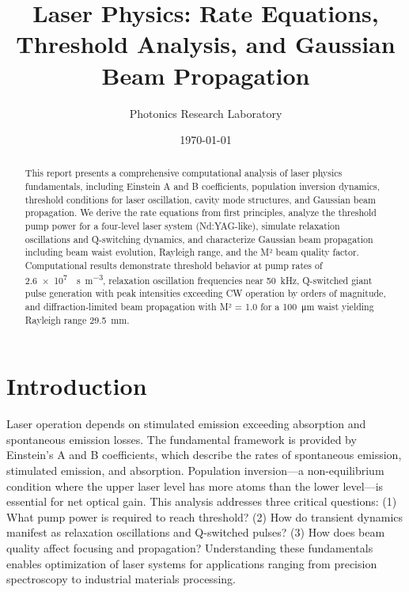 \documentclass[a4paper, 11pt]{article}
\title{Laser Physics: Rate Equations, Threshold Analysis, and Gaussian Beam Propagation}
\author{Photonics Research Laboratory}
\date{\today}
\begin{document}
\maketitle

\begin{abstract}
This report presents a comprehensive computational analysis of laser physics fundamentals,
including Einstein A and B coefficients, population inversion dynamics, threshold conditions
for laser oscillation, cavity mode structures, and Gaussian beam propagation. We derive the
rate equations from first principles, analyze the threshold pump power for a four-level
laser system (Nd:YAG-like), simulate relaxation oscillations and Q-switching dynamics, and
characterize Gaussian beam propagation including beam waist evolution, Rayleigh range, and
the M² beam quality factor. Computational results demonstrate threshold behavior at pump
rates of \SI{2.6e7}{\per\second\per\cubic\meter}, relaxation oscillation frequencies near
\SI{50}{\kilo\hertz}, Q-switched giant pulse generation with peak intensities exceeding
CW operation by orders of magnitude, and diffraction-limited beam propagation with M² = 1.0
for a \SI{100}{\micro\meter} waist yielding Rayleigh range \SI{29.5}{\milli\meter}.
\end{abstract}

\section{Introduction}

Laser operation depends on stimulated emission exceeding absorption and spontaneous emission
losses. The fundamental framework is provided by Einstein's A and B coefficients, which
describe the rates of spontaneous emission, stimulated emission, and absorption. Population
inversion—a non-equilibrium condition where the upper laser level has more atoms than the
lower level—is essential for net optical gain. This analysis addresses three critical
questions: (1) What pump power is required to reach threshold? (2) How do transient dynamics
manifest as relaxation oscillations and Q-switched pulses? (3) How does beam quality affect
focusing and propagation? Understanding these fundamentals enables optimization of laser
systems for applications ranging from precision spectroscopy to industrial materials processing.
\end{document}
